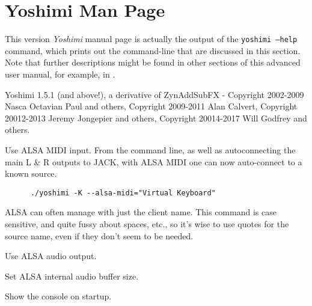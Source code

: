 %
%
%

\section{Yoshimi Man Page}
\label{sec:yoshimi_man_page}

   This version \textsl{Yoshimi} manual page is actually the output of the
   \texttt{yoshimi --help} command, which prints out the command-line that
   are discussed in this section.  Note that further descriptions might be
   found in other sections of this advanced user manual, for example, in
   .

   Yoshimi 1.5.1 (and above!), a derivative of ZynAddSubFX - Copyright
   2002-2009 Nasca Octavian Paul and others, Copyright 2009-2011 Alan Calvert,
   Copyright 20012-2013 Jeremy Jongepier and others,
   Copyright 20014-2017 Will Godfrey and others.

   \setcounter{ItemCounter}{0}      %

      Use ALSA MIDI input.
      From the command line, as well as autoconnecting the main L \& R
      outputs to JACK, with ALSA MIDI one can now auto-connect to a known source.

   \begin{verbatim}
      ./yoshimi -K --alsa-midi="Virtual Keyboard"
   \end{verbatim}

      ALSA can often manage with just the client name.  This command is case
      sensitive, and quite fussy about spaces, etc., so it's wise to use
      quotes for the source name, even if they don't seem to be needed.

      Use ALSA audio output.

      Set ALSA internal audio buffer size.

      Show the console on startup.

